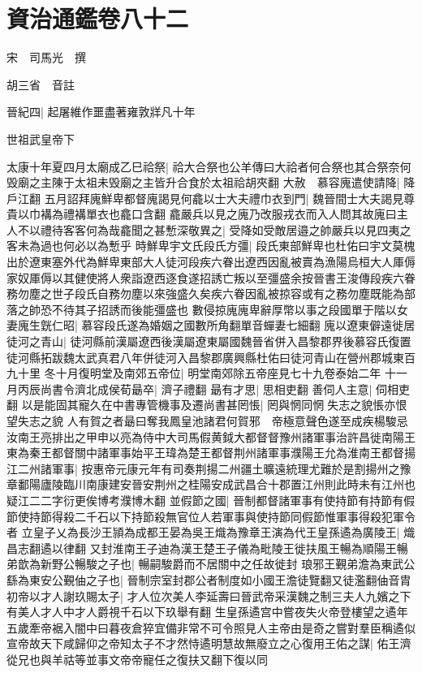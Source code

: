 \section{資治通鑑卷八十二}
宋　司馬光　撰

胡三省　音註

晉紀四|{
	起屠維作噩盡著雍敦牂凡十年}


世祖武皇帝下

太康十年夏四月太廟成乙巳祫祭|{
	祫大合祭也公羊傳曰大祫者何合祭也其合祭奈何毁廟之主陳于太祖未毁廟之主皆升合食於太祖祫胡夾翻}
大赦　慕容廆遣使請降|{
	降戶江翻}
五月詔拜廆鮮卑都督廆謁見何龕以士大夫禮巾衣到門|{
	魏晉間士大夫謁見尊貴以巾褠為禮褠單衣也龕口含翻}
龕嚴兵以見之廆乃改服戎衣而入人問其故廆曰主人不以禮待客客何為哉龕聞之甚慙深敬異之|{
	受降如受敵居邉之帥嚴兵以見四夷之客未為過也何必以為慙乎}
時鮮卑宇文氏段氏方彊|{
	段氏東部鮮卑也杜佑曰宇文莫槐出於遼東塞外代為鮮卑東部大人徒河段疾六眷出遼西因亂被賣為漁陽烏桓大人厙傉家奴厙傉以其健使將人衆詣遼西逐食遂招誘亡叛以至彊盛余按晉書王浚傳段疾六眷務勿塵之世子段氏自務勿塵以來強盛久矣疾六眷因亂被掠容或有之務勿塵既能為部落之帥恐不待其子招誘而後能彊盛也}
數侵掠廆廆卑辭厚幣以事之段國單于階以女妻廆生皝仁昭|{
	慕容段氏遂為婚姻之國數所角翻單音蟬妻七細翻}
廆以遼東僻遠徙居徒河之青山|{
	徒河縣前漢屬遼西後漢屬遼東屬國魏晉省併入昌黎郡界後慕容氏復置徒河縣拓跋魏太武真君八年併徒河入昌黎郡廣興縣杜佑曰徒河青山在營州郡城東百九十里}
冬十月復明堂及南郊五帝位|{
	明堂南郊除五帝座見七十九卷泰始二年}
十一月丙辰尚書令濟北成侯荀朂卒|{
	濟子禮翻}
朂有才思|{
	思相吏翻}
善伺人主意|{
	伺相吏翻}
以是能固其寵久在中書專管機事及遷尚書甚罔悵|{
	罔與惘同惘失志之貌悵亦恨望失志之貌}
人有賀之者朂曰奪我鳳皇池諸君何賀邪　帝極意聲色遂至成疾楊駿忌汝南王亮排出之甲申以亮為侍中大司馬假黄鉞大都督督豫州諸軍事治許昌徙南陽王東為秦王都督關中諸軍事始平王瑋為楚王都督荆州諸軍事濮陽王允為淮南王都督揚江二州諸軍事|{
	按惠帝元康元年有司奏荆揚二州疆土曠遠統理尤難於是割揚州之豫章鄱陽廬陵臨川南康建安晉安荆州之桂陽安成武昌合十郡置江州則此時未有江州也疑江二二字衍更俟博考濮博木翻}
並假節之國|{
	晉制都督諸軍事有使持節有持節有假節使持節得殺二千石以下持節殺無官位人若軍事與使持節同假節惟軍事得殺犯軍令者}
立皇子乂為長沙王頴為成都王晏為吳王熾為豫章王演為代王皇孫遹為廣陵王|{
	熾昌志翻遹以律翻}
又封淮南王子迪為漢王楚王子儀為毗陵王徙扶風王暢為順陽王暢弟歆為新野公暢駿之子也|{
	暢嗣駿爵而不居關中之任故徙封}
琅邪王覲弟澹為東武公繇為東安公覲伷之子也|{
	晉制宗室封郡公者制度如小國王澹徒覽翻又徒濫翻伷音胄}
初帝以才人謝玖賜太子|{
	才人位次美人李延壽曰晉武帝采漢魏之制三夫人九嬪之下有美人才人中才人爵視千石以下玖舉有翻}
生皇孫遹宫中嘗夜失火帝登樓望之遹年五歲牽帝裾入闇中曰暮夜倉猝宜備非常不可令照見人主帝由是奇之嘗對羣臣稱遹似宣帝故天下咸歸仰之帝知太子不才然恃遹明慧故無廢立之心復用王佑之謀|{
	佑王濟從兄也與羊祜等並事文帝帝寵任之復扶又翻下復以同}
